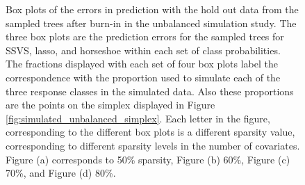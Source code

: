\begin{figure}[H]
\begin{center}
\begin{tabular}{cc}
   \end{tabular}
\caption{ Box plots of the errors in prediction with the hold out data from the sampled trees after burn-in in the unbalanced simulation study. The three box plots are the prediction errors for the sampled trees for SSVS, lasso, and horseshoe within each set of class probabilities. The fractions displayed with each set of four box plots label the  correspondence with the proportion used to simulate each of the three response classes in the simulated data. Also these proportions are the points on the simplex displayed in Figure \ref{fig:simulated_unbalanced_simplex}. Each letter in the figure, corresponding to the different box plots is a different sparsity value, corresponding to different sparsity levels in the number of covariates. Figure  (a) corresponds to 50\% sparsity, Figure (b) 60\%, Figure (c) 70\%, and Figure (d) 80\%. }
\label{fig:unbalanced_study_results}
\end{center}
\end{figure}

